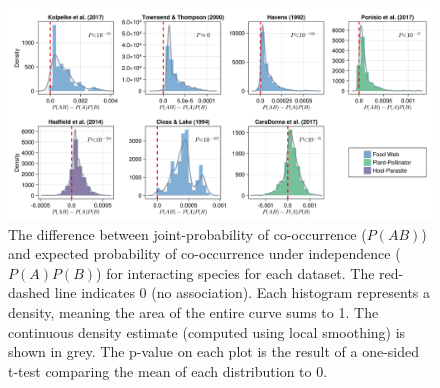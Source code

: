 \documentclass[10pt,oneside]{article}
\makeatletter
\def\maxwidth{\ifdim\Gin@nat@width>\linewidth\linewidth
\else\Gin@nat@width\fi}
\let\Oldincludegraphics\includegraphics
\renewcommand{\includegraphics}[1]{\Oldincludegraphics[width=\maxwidth]{#1}}
\makeatother
\begin{document}
\begin{figure}
\hypertarget{fig:mangal}{%
\centering
\includegraphics{./figures/fig2.png}
\caption{The difference between joint-probability of co-occurrence
(\(P(AB)\)) and expected probability of co-occurrence under independence
(\(P(A)P(B)\)) for interacting species for each dataset. The red-dashed
line indicates 0 (no association). Each histogram represents a density,
meaning the area of the entire curve sums to 1. The continuous density
estimate (computed using local smoothing) is shown in grey. The p-value
on each plot is the result of a one-sided t-test comparing the mean of
each distribution to 0.}\label{fig:mangal}
}
\end{figure}
\end{document}
